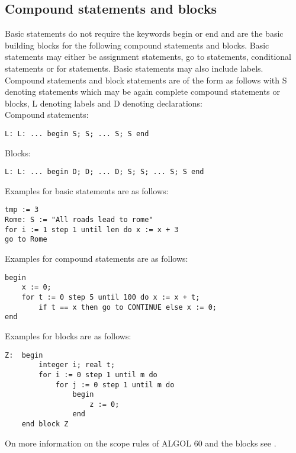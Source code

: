 \documentclass{article}
\begin{document}
\subsection{Compound statements and blocks} \label{compStatsBlocks}
Basic statements do not require the keywords begin or end and are the basic building blocks for the following compound statements and blocks. Basic statements may either be assignment statements, go to statements, conditional statements or for statements. Basic statements may also include labels.\\

Compound statements and block statements are of the form as follows with S denoting statements which may be again complete compound statements or blocks, L denoting labels and D denoting declarations:\\

Compound statements:
\begin{lstlisting}[language={[60]algol}]
L: L: ... begin S; S; ... S; S end
\end{lstlisting}

Blocks:
\begin{lstlisting}[language={[60]algol}]
L: L: ... begin D; D; ... D; S; S; ... S; S end
\end{lstlisting}

Examples for basic statements are as follows:\\ 
\begin{lstlisting}[language={[60]algol}]
tmp := 3
Rome: S := "All roads lead to rome"
for i := 1 step 1 until len do x := x + 3
go to Rome
\end{lstlisting}

Examples for compound statements are as follows:\\
\begin{lstlisting}[language={[60]algol}]
begin
    x := 0;
    for t := 0 step 5 until 100 do x := x + t;
        if t == x then go to CONTINUE else x := 0;
end
\end{lstlisting}

Examples for blocks are as follows:\\ 
\begin{lstlisting}[language={[60]algol}]
Z:  begin 
        integer i; real t;
        for i := 0 step 1 until m do
            for j := 0 step 1 until m do
                begin
                    z := 0;
                end
    end block Z
\end{lstlisting}

On more information on the scope rules of ALGOL 60 and the blocks see .
\end{document}
